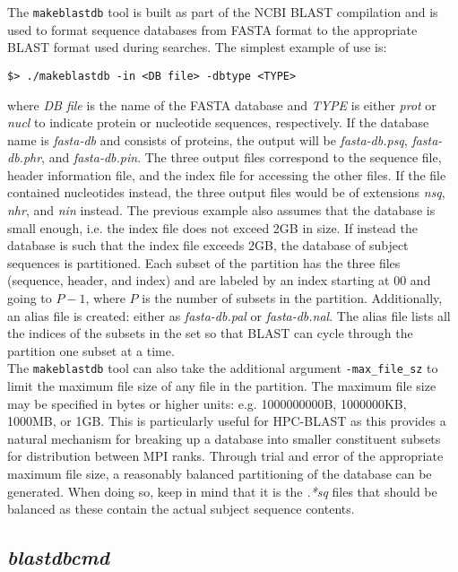 \documentclass[10pt]{article}
\begin{document}
The \verb^makeblastdb^ tool is built as part of the NCBI BLAST compilation and is used to format sequence databases from FASTA format to the appropriate BLAST format used during searches.  The simplest example of
use is:
\begin{verbatim}
$> ./makeblastdb -in <DB file> -dbtype <TYPE>
\end{verbatim}
\noindent where \emph{DB file} is the name of the FASTA database and \emph{TYPE} is either \emph{prot} or \emph{nucl} to indicate protein or nucleotide sequences, respectively.  If the database name is \emph{fasta-db} and
consists of proteins, the output will be \emph{fasta-db.psq}, \emph{fasta-db.phr}, and \emph{fasta-db.pin}.  The three output files correspond to the sequence file, header information file, and the index file for accessing the other files.
If the file contained nucleotides instead, the three output files would be of extensions \emph{nsq}, \emph{nhr}, and \emph{nin} instead.  The previous example also assumes that the database is small enough, i.e. the index file does
not exceed 2GB in size.  If instead the database is such that the index file exceeds 2GB, the database of subject sequences is partitioned.  Each subset of the partition has the three files (sequence, header, and index) and are labeled by an index starting at \(00\)
and going to \(P-1\), where \(P\) is the number of subsets in the partition.  Additionally, an alias file is created: either as \emph{fasta-db.pal} or \emph{fasta-db.nal}.  The alias file lists all the indices of the subsets in the set so that BLAST can cycle
through the partition one subset at a time.\\

\noindent The \verb^makeblastdb^ tool can also take the additional argument \verb^-max_file_sz^ to limit the maximum file size of any file in the partition.  The maximum file size may be specified in bytes or higher units: e.g. 1000000000B, 
1000000KB, 1000MB, or 1GB.  This is particularly useful for HPC-BLAST as this provides a natural mechanism for breaking up a database into smaller constituent subsets for distribution between MPI ranks.  Through trial and error of the
appropriate maximum file size, a reasonably balanced partitioning of the database can be generated.  When doing so, keep in mind that it is the \emph{.*sq} files that should be balanced as these contain the actual subject sequence contents.

\subsection{\emph{blastdbcmd}} \label{ssec:blastdbcmd}
\end{document}
